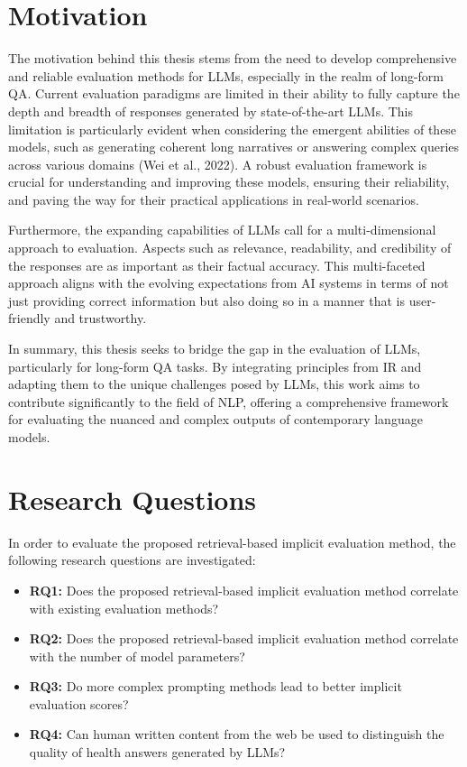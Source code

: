\section{Motivation}\label{sec:motivation}

The motivation behind this thesis stems from the need to develop comprehensive and reliable evaluation methods for LLMs, especially in the realm of long-form QA. Current evaluation paradigms are limited in their ability to fully capture the depth and breadth of responses generated by state-of-the-art LLMs. This limitation is particularly evident when considering the emergent abilities of these models, such as generating coherent long narratives or answering complex queries across various domains (Wei et al., 2022). A robust evaluation framework is crucial for understanding and improving these models, ensuring their reliability, and paving the way for their practical applications in real-world scenarios.

Furthermore, the expanding capabilities of LLMs call for a multi-dimensional approach to evaluation. Aspects such as relevance, readability, and credibility of the responses are as important as their factual accuracy. This multi-faceted approach aligns with the evolving expectations from AI systems in terms of not just providing correct information but also doing so in a manner that is user-friendly and trustworthy.

In summary, this thesis seeks to bridge the gap in the evaluation of LLMs, particularly for long-form QA tasks. By integrating principles from IR and adapting them to the unique challenges posed by LLMs, this work aims to contribute significantly to the field of NLP, offering a comprehensive framework for evaluating the nuanced and complex outputs of contemporary language models.

\section{Research Questions}\label{sec:research-question}
In order to evaluate the proposed retrieval-based implicit evaluation method, the following research questions are investigated:
\begin{itemize}
    \item \textbf{RQ1:} Does the proposed retrieval-based implicit evaluation method correlate with existing evaluation methods?
    \item \textbf{RQ2:} Does the proposed retrieval-based implicit evaluation method correlate with the number of model parameters?
    \item \textbf{RQ3:} Do more complex prompting methods lead to better implicit evaluation scores?
    \item \textbf{RQ4:} Can human written content from the web be used to distinguish the quality of health answers generated by LLMs?
\end{itemize}



